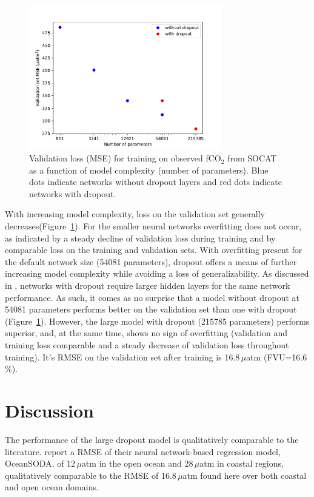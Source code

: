 \documentclass{article}
\begin{document}
	
	\begin{figure}
		\centering
		\includegraphics[width=0.75\textwidth]{./figures/fco2_training_on_obs_complexity_and_dropout.pdf}
		\caption{Validation loss (MSE) for training on observed fCO$_2$ from SOCAT as a function of model complexity (number of parameters). Blue dots indicate networks without dropout layers and red dots indicate networks with dropout.}
		\label{fig:mse_vs_complexity}
	\end{figure}
	
	 With increasing model complexity, loss on the validation set generally decreases(Figure~\ref{fig:mse_vs_complexity}). For the smaller neural networks overfitting does not occur, as indicated by a steady decline of validation loss during training and by comparable loss on the training and validation sets. With overfitting present for the default network size (54081 parameters), dropout offers a means of further increasing model complexity while avoiding a loss of generalizability. As discussed in \cite{srivastava2014}, networks with dropout require larger hidden layers for the same network performance. As such, it comes as no surprise that a model without dropout at 54081 parameters performs better on the validation set than one with dropout (Figure~\ref{fig:mse_vs_complexity}). However, the large model with dropout (215785 parameters) performs superior, and, at the same time, shows no sign of overfitting (validation and training loss comparable and a steady decrease of validation loss throughout training). It's RMSE on the validation set after training is 16.8\,$\mu$atm (FVU=16.6\,\%). 
	
	
	
	\section{Discussion} \label{sec:conclusions}
	The performance of the large dropout model is qualitatively comparable to the literature. \cite{gregor2021} report a RMSE of their neural network-based regression model, OceanSODA, of 12\,$\mu$atm in the open ocean and 28\,$\mu$atm in coastal regions, qualitatively comparable to the RMSE of 16.8\,$\mu$atm found here over both coastal and open ocean domains. \\
	
\end{document}
